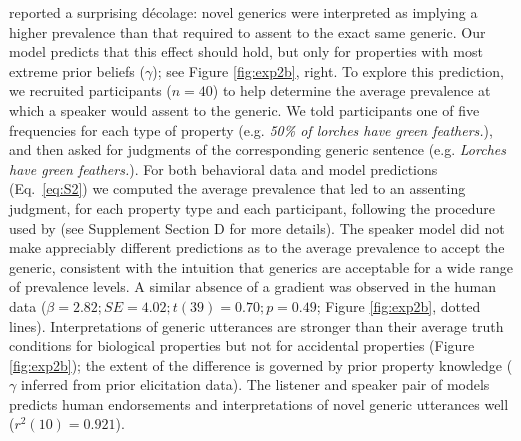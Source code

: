 \documentclass[10pt,letterpaper]{article}
\newcommand{\ndg}[1]{\textcolor{Green}{[ndg: #1]}}
\begin{document}
 reported a surprising d\'{e}colage: novel generics were interpreted as implying a higher prevalence than that required to assent to the exact same generic.
Our model predicts that this effect should hold, but only for properties with most extreme prior beliefs ($\gamma$); see Figure \ref{fig:exp2b}, right.
To explore this prediction, we recruited participants ($n=40$) to help determine the average prevalence at which a speaker would assent to the generic. 
We told participants one of five frequencies for each type of property (e.g. \emph{50\% of lorches have green feathers.}), and then asked for judgments of the corresponding generic sentence (e.g. \emph{Lorches have green feathers.}). 
For both behavioral data and model predictions (Eq.~\ref{eq:S2})  we computed the average prevalence that led to an assenting judgment, for each property type and each participant, following the procedure used by  (see Supplement Section D for more details).
%
%
The speaker model did not make appreciably different predictions as to the average prevalence to accept the generic, consistent with the intuition that generics are acceptable for a wide range of prevalence levels. 
A similar absence of a gradient was observed in the human data ($\beta = 2.82; SE = 4.02; t(39) = 0.70; p = 0.49$; Figure \ref{fig:exp2b}, dotted lines). 
Interpretations of generic utterances are stronger than their average truth conditions for biological properties but not for accidental properties (Figure \ref{fig:exp2b}); the extent of the difference is governed by prior property knowledge ($\gamma$ inferred from prior elicitation data).
The listener and speaker pair of models predicts human endorsements and interpretations of novel generic utterances well ($r^2(10) = 0.921$). 
\end{document}
